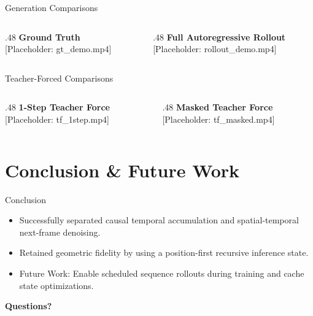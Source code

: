 \documentclass[aspectratio=169]{beamer}
\begin{document}
\begin{frame}{Generation Comparisons}
    
    \begin{columns}[T] %
        \begin{column}{.48\textwidth}
            \textbf{Ground Truth} \\
            [Placeholder: gt\_demo.mp4]
        \end{column}
        \begin{column}{.48\textwidth}
            \textbf{Full Autoregressive Rollout} \\
            [Placeholder: rollout\_demo.mp4]
        \end{column}
    \end{columns}
\end{frame}

\begin{frame}{Teacher-Forced Comparisons}
    \begin{columns}[T]
        \begin{column}{.48\textwidth}
            \textbf{1-Step Teacher Force} \\
            [Placeholder: tf\_1step.mp4]
        \end{column}
        \begin{column}{.48\textwidth}
            \textbf{Masked Teacher Force} \\
            [Placeholder: tf\_masked.mp4]
        \end{column}
    \end{columns}
\end{frame}

\section{Conclusion \& Future Work}

\begin{frame}{Conclusion}
    \begin{itemize}
        \item Successfully separated causal temporal accumulation and spatial-temporal next-frame denoising.
        \item Retained geometric fidelity by using a position-first recursive inference state.
        \item Future Work: Enable scheduled sequence rollouts during training and cache state optimizations.
    \end{itemize}
    \vspace{0.8cm}
    \centering \Large \textbf{Questions?}
\end{frame}
\end{document}
